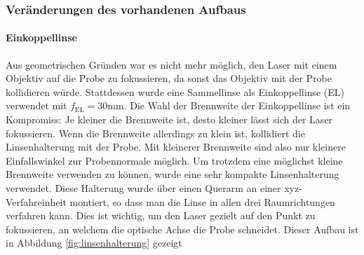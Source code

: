 \documentclass{article}
\begin{document}
	\subsubsection{Veränderungen des vorhandenen Aufbaus}
		\paragraph{Einkoppellinse}
		Aus geometrischen Gründen war es nicht mehr möglich, den Laser mit einem Objektiv auf die Probe zu fokussieren, da sonst das Objektiv mit der Probe kollidieren würde. Stattdessen wurde eine Sammellinse als Einkoppellinse (EL) verwendet mit $f_{\mathrm{EL}}= 30\mathrm{mm}$. Die Wahl der Brennweite der Einkoppellinse ist ein Kompromiss: Je kleiner die Brennweite ist, desto kleiner lässt sich der Laser fokussieren. Wenn die Brennweite allerdings zu klein ist, kollidiert die Linsenhalterung mit der Probe. Mit kleinerer Brennweite sind also nur kleinere Einfallswinkel zur Probennormale möglich. Um trotzdem eine möglichst kleine Brennweite verwenden zu können, wurde eine sehr kompakte Linsenhalterung verwendet. Diese Halterung wurde über einen Querarm an einer xyz-Verfahreinheit montiert, so dass man die Linse in allen drei Raumrichtungen verfahren kann. Dies ist wichtig, um den Laser gezielt auf den Punkt zu fokussieren, an welchem die optische Achse die Probe schneidet. Dieser Aufbau ist in Abbildung \ref{fig:linsenhalterung} gezeigt
\end{document}
